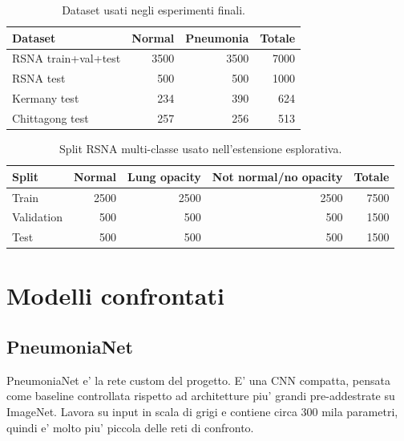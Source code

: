 \documentclass[11pt,a4paper]{article}
\begin{document}
\begin{table}[H]
\centering
\caption{Dataset usati negli esperimenti finali.}
\begin{tabular}{lrrr}
\toprule
Dataset & Normal & Pneumonia & Totale \\
\midrule
RSNA train+val+test & 3500 & 3500 & 7000 \\
RSNA test & 500 & 500 & 1000 \\
Kermany test & 234 & 390 & 624 \\
Chittagong test & 257 & 256 & 513 \\
\bottomrule
\end{tabular}
\end{table}

\begin{table}[H]
\centering
\caption{Split RSNA multi-classe usato nell'estensione esplorativa.}
\begin{tabular}{lrrrr}
\toprule
Split & Normal & Lung opacity & Not normal/no opacity & Totale \\
\midrule
Train & 2500 & 2500 & 2500 & 7500 \\
Validation & 500 & 500 & 500 & 1500 \\
Test & 500 & 500 & 500 & 1500 \\
\bottomrule
\end{tabular}
\end{table}

\section{Modelli confrontati}

\subsection{PneumoniaNet}

PneumoniaNet e' la rete custom del progetto. E' una CNN compatta, pensata come
baseline controllata rispetto ad architetture piu' grandi pre-addestrate su
ImageNet. Lavora su input in scala di grigi e contiene circa 300 mila
parametri, quindi e' molto piu' piccola delle reti di confronto.
\end{document}

